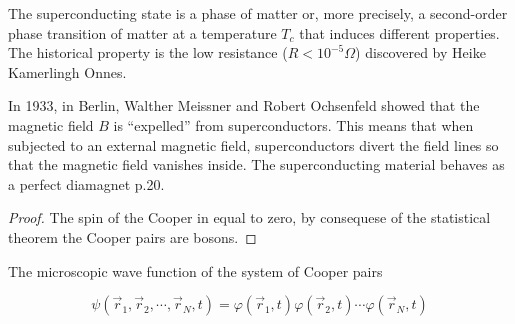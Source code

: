 
The superconducting state is a phase of matter or, more precisely, 
a second-order phase transition of matter at a temperature $T_c$ that 
induces different properties. The historical property is the low resistance 
($R < 10^{-5} \Omega$) discovered by Heike Kamerlingh Onnes.



\newpage
In 1933, in Berlin, 
Walther Meissner and Robert 
Ochsenfeld showed that the magnetic 
field $B$ is “expelled” from superconductors. 
This means that when subjected to an external magnetic 
field, superconductors divert the field lines so that the 
magnetic field vanishes inside. The superconducting material 
behaves as a perfect diamagnet \cite{mangin_superconductivity_2017} p.20.







\begin{proof}
    The spin of the Cooper in equal to zero, by consequese 
    of the statistical theorem the Cooper pairs are bosons.
\end{proof}



The microscopic wave function of the system of Cooper pairs 

\begin{equation}
    \psi (\vec{r}_1, \vec{r}_2, \cdots, \vec{r}_N, t )
    = \varphi(\vec{r}_1,t)\varphi(\vec{r}_2,t)\cdots\varphi(\vec{r}_N,t)
\end{equation}

